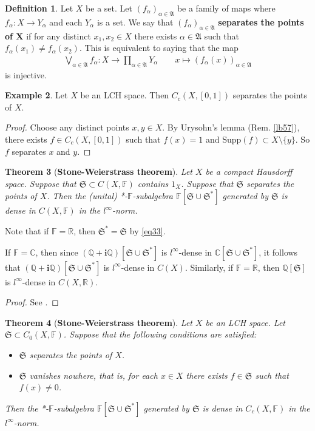 \documentclass[12pt,b5paper,notitlepage]{article}
\theoremstyle{definition}
\newtheorem{df}{Definition}[subsection]
\newtheorem{eg}[df]{Example}
\theoremstyle{plain}
\newtheorem{thm}[df]{Theorem}
\newcommand{\fk}{\mathfrak}
\newcommand{\im}{\mathbf{i}}
\newcommand{\Cbb}{\mathbb C}
\newcommand{\Qbb}{\mathbb Q}
\newcommand{\Rbb}{\mathbb R}
\newcommand{\Supp}{\mathrm{Supp}}
\newcommand{\Fbb}{\mathbb F}
\numberwithin{equation}{section}
\begin{document}
\begin{df}
Let $X$ be a set. Let $(f_\alpha)_{\alpha\in\fk A}$ be a family of maps where $f_\alpha:X\rightarrow Y_\alpha$ and each $Y_\alpha$ is a set.  We say that $(f_\alpha)_{\alpha\in\fk A}$ \textbf{separates the points of $\pmb X$}  if for any distinct $x_1,x_2\in X$ there exists $\alpha\in\fk A$ such that $f_\alpha(x_1)\neq f_\alpha(x_2)$. This is equivalent to saying that the map
\begin{gather}
\bigvee_{\alpha\in\fk A}f_\alpha:X\rightarrow \prod_{\alpha\in\fk A}Y_\alpha\qquad x\mapsto (f_\alpha(x))_{\alpha\in\fk A}
\end{gather}
is injective.
\end{df}


\begin{eg}\label{lb58}
Let $X$ be an LCH space. Then $C_c(X,[0,1])$ separates the points of $X$.
\end{eg}

\begin{proof}
Choose any distinct points $x,y\in X$. By Urysohn's lemma (Rem. \ref{lb57}), there exists $f\in C_c(X,[0,1])$ such that $f(x)=1$ and $\Supp(f)\subset X\setminus\{y\}$. So $f$ separates $x$ and $y$.
\end{proof}

\begin{thm}[\textbf{Stone-Weierstrass theorem}]\label{lb87}
Let $X$ be a compact Hausdorff space. Suppose that $\fk S\subset C(X,\Fbb)$ contains $1_X$. Suppose that $\fk S$ separates the points of $X$. Then the (unital) *-$\Fbb$-subalgebra $\Fbb[\fk S\cup\fk S^*]$ generated by $\fk S$ is dense in $C(X,\Fbb)$ in the $l^\infty$-norm.
\end{thm}

Note that if $\Fbb=\Rbb$, then $\fk S^*=\fk S$ by \eqref{eq33}.

If $\Fbb=\Cbb$, then since $(\Qbb+\im\Qbb)[\fk S\cup\fk S^*]$ is $l^\infty$-dense in $\Cbb[\fk S\cup\fk S^*]$, it follows that $(\Qbb+\im\Qbb)[\fk S\cup\fk S^*]$ is $l^\infty$-dense in $C(X)$. Similarly, if $\Fbb=\Rbb$, then $\Qbb[\fk S]$ is $l^\infty$-dense in $C(X,\Rbb)$.

\begin{proof}
See \cite[Ch. 15]{Gui-A}.
\end{proof}


\begin{thm}[\textbf{Stone-Weierstrass theorem}]\label{lb360}
Let $X$ be an LCH space. Let $\fk S\subset C_0(X,\Fbb)$. Suppose that the following conditions are satisfied:
\begin{itemize}
\item[(1)] $\fk S$ separates the points of $X$.
\item[(2)] $\fk S$ vanishes nowhere, that is, for each $x\in X$ there exists $f\in\fk S$ such that $f(x)\neq0$.
\end{itemize}
Then the *-$\Fbb$-subalgebra $\Fbb[\fk S\cup\fk S^*]$ generated by $\fk S$ is dense in $C_c(X,\Fbb)$ in the $l^\infty$-norm.
\end{thm}
\end{document}
